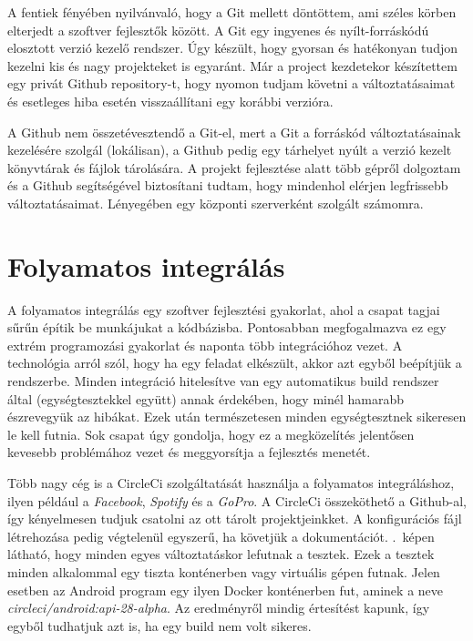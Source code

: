 \documentclass{thesis-ekf}
\theoremstyle{definition}
\theoremstyle{remark}
\begin{document}
A fentiek fényében nyilvánvaló, hogy a Git mellett döntöttem, ami széles körben elterjedt a szoftver fejlesztők között.
A Git egy ingyenes és nyílt-forráskódú elosztott verzió kezelő rendszer. Úgy készült, hogy gyorsan és hatékonyan tudjon kezelni kis és nagy projekteket is egyaránt.
Már a project kezdetekor készítettem egy privát Github repository-t, hogy nyomon tudjam követni a változtatásaimat és esetleges hiba esetén visszaállítani egy korábbi verzióra.

A Github nem összetévesztendő a Git-el, mert a Git a forráskód változtatásainak kezelésére szolgál (lokálisan), a Github pedig egy tárhelyet nyúlt a verzió kezelt könyvtárak és fájlok tárolására.
A projekt fejlesztése alatt több gépről dolgoztam és a Github segítségével biztosítani tudtam, hogy mindenhol elérjen legfrissebb változtatásaimat.
Lényegében egy központi szerverként szolgált számomra.

\section{Folyamatos integrálás}

A folyamatos integrálás egy szoftver fejlesztési gyakorlat, ahol a csapat tagjai sűrűn építik be munkájukat a kódbázisba.
Pontosabban megfogalmazva ez egy extrém programozási gyakorlat és naponta több integrációhoz vezet.
A technológia arról szól, hogy ha egy feladat elkészült, akkor azt egyből beépítjük a rendszerbe.
Minden integráció hitelesítve van egy automatikus build rendszer által (egységtesztekkel együtt) annak érdekében, hogy minél hamarabb észrevegyük az hibákat.
Ezek után természetesen minden egységtesztnek sikeresen le kell futnia.
Sok csapat úgy gondolja, hogy ez a megközelítés jelentősen kevesebb problémához vezet és meggyorsítja a fejlesztés menetét.\cite{continuous_integration}

Több nagy cég is a CircleCi szolgáltatását használja a folyamatos integráláshoz, ilyen például a \emph{Facebook}, \emph{Spotify} és a \emph{GoPro}.
A CircleCi összeköthető a Github-al, így kényelmesen tudjuk csatolni az ott tárolt projektjeinkket.
A konfigurációs fájl létrehozása pedig végtelenül egyszerű, ha követjük a dokumentációt.
.~képen látható, hogy minden egyes változtatáskor lefutnak a tesztek.
Ezek a tesztek minden alkalommal egy tiszta konténerben vagy virtuális gépen futnak.
Jelen esetben az Android program egy ilyen Docker konténerben fut, aminek a neve \emph{circleci/android:api-28-alpha}.
Az eredményről mindig értesítést kapunk, így egyből tudhatjuk azt is, ha egy build nem volt sikeres.
\end{document}
